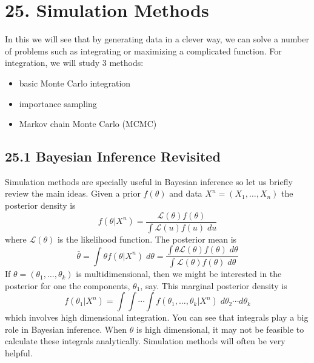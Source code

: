 \section*{25. Simulation Methods}\label{simulations:methods}
In this we will see that by generating data in a clever way, we can
solve a number of problems such as integrating or maximizing a
complicated function. For integration, we will study 3 methods:
\begin{itemize}[tightlist]
\item
  basic Monte Carlo integration
\item
  importance sampling
\item
  Markov chain Monte Carlo (MCMC)
\end{itemize}

\subsection*{25.1 Bayesian Inference Revisited}\label{bayesian-inference-revisited}
Simulation methods are specially useful in Bayesian inference so let us
briefly review the main ideas. Given a prior \(f(\theta)\) and data
\(X^{n} = (X_{1}, \dots, X_{n})\) the posterior density is
\[
f(\theta | X^{n}) = \frac{\mathcal{L}(\theta) f(\theta)}{ \int \mathcal{L}(u) f(u) \; du}
\]
where \(\mathcal{L}(\theta)\) is the likelihood function. The posterior
mean is
\[
\bar{\theta} = \int \theta f(\theta | X^{n}) \; d\theta = \frac{\int \theta \mathcal{L}(\theta) f(\theta) \; d\theta}{\int \mathcal{L}(\theta) f(\theta) \; d\theta}
\]
If \(\theta = (\theta_{1}, \dots, \theta_{k})\) is multidimensional, then we
might be interested in the posterior for one the components,
\(\theta_{1}\), say. This marginal posterior density is
\[
f(\theta_{1} | X^{n}) = \int \int \cdots \int f(\theta_{1}, \dots, \theta_{k} | X^{n}) \; d\theta_{2} \cdots d\theta_{k}
\]
which involves high dimensional integration.
You can see that integrals play a big role in Bayesian inference. When
\(\theta\) is high dimensional, it may not be feasible to calculate
these integrals analytically. Simulation methods will often be very
helpful.

